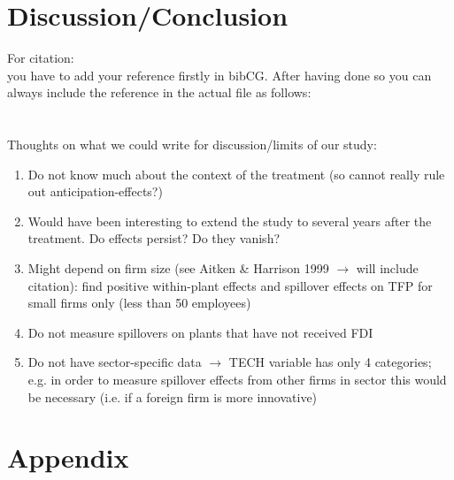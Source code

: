 \documentclass[a4paper,11pt]{scrartcl}
\newcommand{\sectionnumbering}[1]{%
  \setcounter{section}{0}%
   \renewcommand{\thesection}{\csname #1\endcsname{section}}}
\begin{document}
\section{Discussion/Conclusion}
For citation: \\
you have to add your reference firstly in bibCG. After having done so you can always include the reference in the actual file as follows: \\
 \citet{biddle1990sleep}\\
\citep[p.~35]{CaliendoHujerThomsen2008}	 \\


Thoughts on what we could write for discussion/limits of our study: 
\begin{enumerate}
\item Do not know much about the context of the treatment (so cannot really rule out anticipation-effects?)
\item Would have been interesting to extend the study to several years after the treatment. Do effects persist? Do they vanish? 
\item Might depend on firm size (see Aitken \& Harrison 1999 $\rightarrow$ will include citation): find positive within-plant effects and spillover effects on TFP for small firms only (less than 50 employees)
\item Do not measure spillovers on plants that have not received FDI
\item Do not have sector-specific data $\rightarrow$ TECH variable has only 4 categories; e.g. in order to measure spillover effects from other firms in sector this would be necessary (i.e. if a foreign firm is more innovative)
\end{enumerate}


\newpage

 
\newpage



\section*{Appendix}
\sectionnumbering{Roman}
\setcounter{page}{3} %
\end{document}
